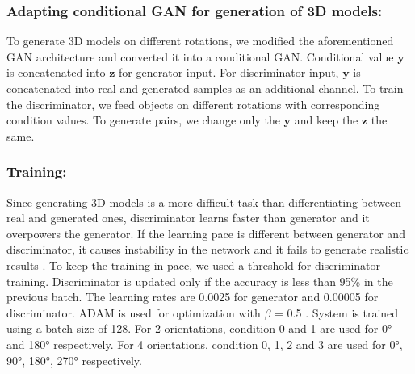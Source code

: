 \documentclass[runningheads]{llncs}
\begin{document}
\subsubsection{Adapting conditional GAN for generation of 3D models:} To generate 3D models on different rotations, we modified the aforementioned GAN architecture and converted it into a conditional GAN. Conditional value $\mathbf{y}$  is concatenated into $\mathbf{z}$ for generator input. For discriminator input, $\mathbf{y}$  is concatenated into real and generated samples as an additional channel. To train the discriminator, we feed objects on different rotations with corresponding condition values. To generate pairs, we change only the $\mathbf{y}$  and keep the $\mathbf{z}$ the same. 

\subsubsection{Training:} Since generating 3D models is a more difficult task than differentiating between real and generated ones, discriminator learns faster than generator and it overpowers the generator. If the learning pace is different between generator and discriminator, it causes instability in the network and it fails to generate realistic results \cite{goodfellow2014generative}. To keep the training in pace, we used a threshold for discriminator training. Discriminator is updated only if the accuracy is less than 95\% in the previous batch. The learning rates are 0.0025 for generator and 0.00005 for discriminator. ADAM \cite{kingma2015adam} is used for optimization with $\beta$ = 0.5 . System is trained using a batch size of 128. For 2 orientations, condition 0 and 1 are used for \ang{0} and \ang{180} respectively. For 4 orientations, condition 0, 1, 2 and 3 are used for \ang{0}, \ang{90}, \ang{180}, \ang{270} respectively.
\end{document}
